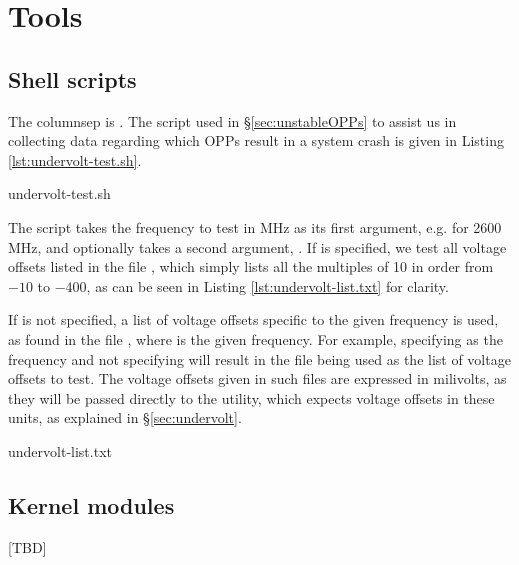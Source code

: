 \section{Tools}
\label{sec:tools}

\subsection{Shell scripts}
\label{sec:undervolt-test.sh}

The columnsep is \the\columnsep. The script used in §\ref{sec:unstableOPPs} to assist us in collecting data
regarding which OPPs result in a system crash is given in Listing
\ref{lst:undervolt-test.sh}.


    {undervolt-test.sh}

The script takes the frequency to test in MHz as its first argument, e.g.
 for 2600 MHz, and optionally takes a second argument, .
If  is specified, we test all voltage offsets listed in the file
, which simply lists all the multiples of 10 in order
from $-10$ to $-400$, as can be seen in Listing \ref{lst:undervolt-list.txt}
for clarity.

If  is not specified, a list of voltage offsets specific
to the given frequency is used, as found in the file
, where  is the given
frequency. For example, specifying  as the frequency and not
specifying  will result in the file 
being used as the list of voltage offsets to test. The voltage offsets given in
such files are expressed in milivolts, as they will be passed directly to the
 utility, which expects voltage offsets in these units, as
explained in §\ref{sec:undervolt}.


    {undervolt-list.txt}

\subsection{Kernel modules}

[TBD]

